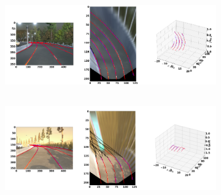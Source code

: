    \begin{figure}[h]
      \caption{Qualitative results of the GenLaneNet\cite{guo2020gen} trained with complex binary lane segmentation architecture on rarely observed scenes from sim3D\cite{guo2020gen} dataset: (a) uphill (b) downhill scenario}
        \centering
        \begin{subfigure}{0.6\textwidth}
        \includegraphics[width=1\linewidth, height=4cm]{images/uphill_rare.png} 
        \caption{}
        \label{fig:subim1}
        \end{subfigure}
        \begin{subfigure}{0.6\textwidth}
        \includegraphics[width=1\linewidth,height=4cm]{images/downhill_rare.png}
        \caption{}
        \label{fig:subim2}
        \end{subfigure}
        \end{figure}
        
